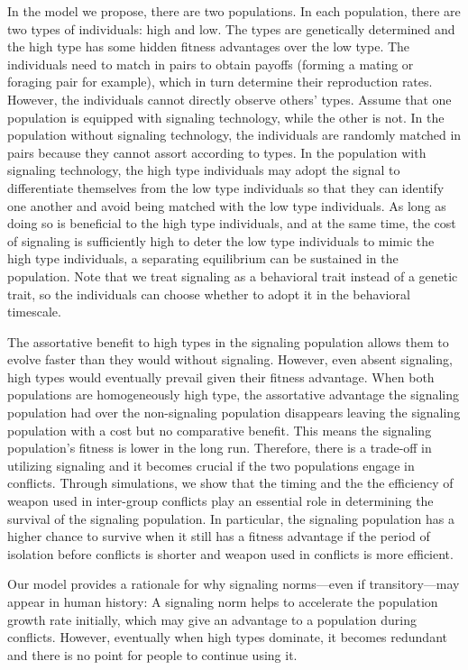 In the model we propose, there are two populations. In each population, there are two types of individuals: high and low. The types are genetically determined and the high type has some hidden fitness advantages over the low type. The individuals need to match in pairs to obtain payoffs (forming a mating or foraging pair for example), which in turn determine their reproduction rates. However, the individuals cannot directly observe others' types. Assume that one population is equipped with signaling technology, while the other is not. In the population without signaling technology, the individuals are randomly matched in pairs because they cannot assort according to types. In the population with signaling technology, the high type individuals may adopt the signal to differentiate themselves from the low type individuals so that they can identify one another and avoid being matched with the low type individuals. As long as doing so is beneficial to the high type individuals, and at the same time, the cost of signaling is sufficiently high to deter the low type individuals to mimic the high type individuals, a separating equilibrium can be sustained in the population. Note that we treat signaling as a behavioral trait instead of a genetic trait, so the individuals can choose whether to adopt it in the behavioral timescale. 

The assortative benefit to high types in the signaling population allows them to evolve faster than they would without signaling. However, even absent signaling, high types would eventually prevail given their fitness advantage. When both populations are homogeneously high type, the assortative advantage the signaling population had over the non-signaling population disappears leaving the signaling population with a cost but no comparative benefit. This means the signaling population's fitness is lower in the long run.
Therefore, there is a trade-off in utilizing signaling and it becomes crucial if the two populations engage in conflicts. Through simulations, we show that the timing and the the efficiency of weapon used in inter-group conflicts play an essential role in determining the survival of the signaling population. In particular, the signaling population has a higher chance to survive when it still has a fitness advantage if the period of isolation before conflicts is shorter and weapon used in conflicts is more efficient. 

Our model provides a rationale for why signaling norms---even if transitory---may appear in human history: A signaling norm helps to accelerate the population growth rate initially, which may give an advantage to a population during conflicts. However, eventually when high types dominate, it becomes redundant and there is no point for people to continue using it.

